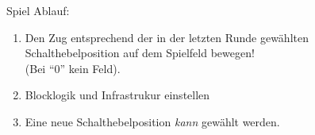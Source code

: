 

Spiel Ablauf:
\begin{enumerate}
  \item Den Zug entsprechend der in der letzten Runde gewählten Schalthebelposition auf dem Spielfeld bewegen!\\ (Bei “0” kein Feld).
  \item Blocklogik und Infrastrukur einstellen
  \item Eine neue Schalthebelposition \emph{kann} gewählt werden.
\end{enumerate}
